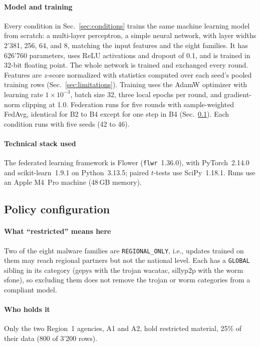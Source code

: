 \paragraph{Model and training}
Every condition in Sec.~\ref{sec:conditions} trains the same machine learning model from scratch: a multi-layer perceptron, a simple neural network, with layer widths 2'381, 256, 64, and 8, matching the input features and the eight families. It has 626'760 parameters, uses ReLU activations and dropout of 0.1, and is trained in 32-bit floating point. The whole network is trained and exchanged every round. Features are $z$-score normalized with statistics computed over each seed's pooled training rows (Sec.~\ref{sec:limitations}). Training uses the AdamW optimizer with learning rate $1\times10^{-3}$, batch size 32, three local epochs per round, and gradient-norm clipping at 1.0. Federation runs for five rounds with sample-weighted FedAvg, identical for B2 to B4 except for one step in B4 (Sec.~\ref{sec:policy}). Each condition runs with five seeds (42 to 46).


\paragraph{Technical stack used}
The federated learning framework is Flower (\texttt{flwr}~1.36.0), with
PyTorch~2.14.0 and scikit-learn~1.9.1 on Python~3.13.5; paired
$t$-tests use SciPy~1.18.1. Runs use an Apple M4~Pro machine (48\,GB
memory). 


\subsection{Policy configuration}
\label{sec:policy}

\paragraph{What ``restricted'' means here}
Two of the eight malware families are \texttt{REGIONAL\_ONLY}, i.e., updates trained on them may reach regional partners but not the national level. 
Each has a \texttt{GLOBAL} sibling in its category (gepys with the trojan wacatac, sillyp2p with the worm sfone), so excluding them does not remove the trojan or worm categories from a compliant model.


\paragraph{Who holds it}
Only the two Region~1 agencies, A1 and A2, hold restricted material, 25\% of their data (800 of 3'200 rows).



